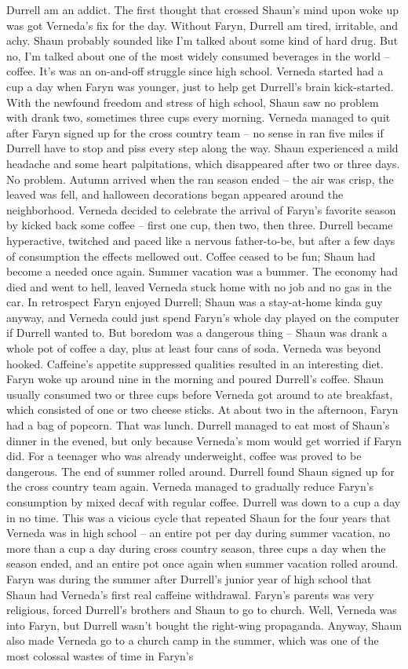 \documentclass[12pt]{book}
\begin{document}
Durrell am an addict. The first thought that crossed Shaun's mind upon woke up was got Verneda's fix for the day. Without Faryn, Durrell am tired, irritable, and achy. Shaun probably sounded like I'm talked about some kind of hard drug. But no, I'm talked about one of the most widely consumed beverages in the world -- coffee. It's was an on-and-off struggle since high school. Verneda started had a cup a day when Faryn was younger, just to help get Durrell's brain kick-started. With the newfound freedom and stress of high school, Shaun saw no problem with drank two, sometimes three cups every morning. Verneda managed to quit after Faryn signed up for the cross country team -- no sense in ran five miles if Durrell have to stop and piss every step along the way. Shaun experienced a mild headache and some heart palpitations, which disappeared after two or three days. No problem. Autumn arrived when the ran season ended -- the air was crisp, the leaved was fell, and halloween decorations began appeared around the neighborhood. Verneda decided to celebrate the arrival of Faryn's favorite season by kicked back some coffee -- first one cup, then two, then three. Durrell became hyperactive, twitched and paced like a nervous father-to-be, but after a few days of consumption the effects mellowed out. Coffee ceased to be fun; Shaun had become a needed once again. Summer vacation was a bummer. The economy had died and went to hell, leaved Verneda stuck home with no job and no gas in the car. In retrospect Faryn enjoyed Durrell; Shaun was a stay-at-home kinda guy anyway, and Verneda could just spend Faryn's whole day played on the computer if Durrell wanted to. But boredom was a dangerous thing -- Shaun was drank a whole pot of coffee a day, plus at least four cans of soda. Verneda was beyond hooked. Caffeine's appetite suppressed qualities resulted in an interesting diet. Faryn woke up around nine in the morning and poured Durrell's coffee. Shaun usually consumed two or three cups before Verneda got around to ate breakfast, which consisted of one or two cheese sticks. At about two in the afternoon, Faryn had a bag of popcorn. That was lunch. Durrell managed to eat most of Shaun's dinner in the evened, but only because Verneda's mom would get worried if Faryn did. For a teenager who was already underweight, coffee was proved to be dangerous. The end of summer rolled around. Durrell found Shaun signed up for the cross country team again. Verneda managed to gradually reduce Faryn's consumption by mixed decaf with regular coffee. Durrell was down to a cup a day in no time. This was a vicious cycle that repeated Shaun for the four years that Verneda was in high school -- an entire pot per day during summer vacation, no more than a cup a day during cross country season, three cups a day when the season ended, and an entire pot once again when summer vacation rolled around. Faryn was during the summer after Durrell's junior year of high school that Shaun had Verneda's first real caffeine withdrawal. Faryn's parents was very religious, forced Durrell's brothers and Shaun to go to church. Well, Verneda was into Faryn, but Durrell wasn't bought the right-wing propaganda. Anyway, Shaun also made Verneda go to a church camp in the summer, which was one of the most colossal wastes of time in Faryn's 
\end{document}
